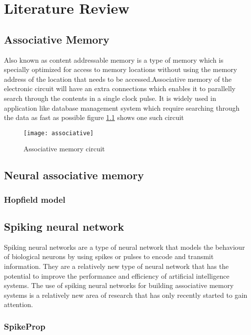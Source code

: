 \chapter{Literature Review}
\section{Associative Memory}

Also known as content addressable memory is a type of memory which is specially
optimized for access to memory locations without using the memory address of
the location that needs to be accessed.Associative memory of the electronic
circuit will have an extra connections which enables it to parallelly search
through the contents in a single clock pulse. It is widely used in application
like database management system which require searching through the data as fast as possible
figure \ref{associative_circuit} shows one such circuit
\begin{figure}[h!]
	\centering
	\texttt{[image: associative]}
	\caption{Associative memory circuit}
	\label{associative_circuit}
\end{figure}
\section{Neural associative memory}
\subsection{Hopfield model}
\section{Spiking neural network}
Spiking neural networks are a type of neural network that models the behaviour
of biological neurons by using spikes or pulses to encode and transmit
information. They are a relatively new type of neural network that has the
potential to improve the performance and efficiency of artificial intelligence
systems. The use of spiking neural networks for building associative memory
systems is a relatively new area of research that has only recently started to
gain attention.
\subsection{SpikeProp}
